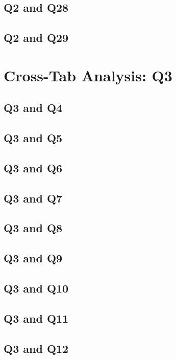 \documentclass{report}
\begin{document}
\section{Q2 and Q28}\clearpage
\section{Q2 and Q29}\clearpage

\chapter{Cross-Tab Analysis: Q3}

\section{Q3 and Q4}\clearpage
\section{Q3 and Q5}\clearpage
\section{Q3 and Q6}\clearpage
\section{Q3 and Q7}\clearpage
\section{Q3 and Q8}\clearpage
\section{Q3 and Q9}\clearpage
\section{Q3 and Q10}\clearpage
\section{Q3 and Q11}\clearpage
\section{Q3 and Q12}\clearpage
\end{document}
